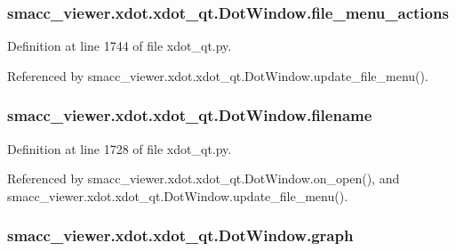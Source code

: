 \subsubsection[{\texorpdfstring{file\+\_\+menu\+\_\+actions}{file_menu_actions}}]{\setlength{\rightskip}{0pt plus 5cm}smacc\+\_\+viewer.\+xdot.\+xdot\+\_\+qt.\+Dot\+Window.\+file\+\_\+menu\+\_\+actions}\hypertarget{classsmacc__viewer_1_1xdot_1_1xdot__qt_1_1DotWindow_a812d913b31f5ef7717e4b0687e8cde4b}{}\label{classsmacc__viewer_1_1xdot_1_1xdot__qt_1_1DotWindow_a812d913b31f5ef7717e4b0687e8cde4b}


Definition at line 1744 of file xdot\+\_\+qt.\+py.



Referenced by smacc\+\_\+viewer.\+xdot.\+xdot\+\_\+qt.\+Dot\+Window.\+update\+\_\+file\+\_\+menu().

\subsubsection[{\texorpdfstring{filename}{filename}}]{\setlength{\rightskip}{0pt plus 5cm}smacc\+\_\+viewer.\+xdot.\+xdot\+\_\+qt.\+Dot\+Window.\+filename}\hypertarget{classsmacc__viewer_1_1xdot_1_1xdot__qt_1_1DotWindow_a8be84c72284dbb6ae2d6e65a03617b23}{}\label{classsmacc__viewer_1_1xdot_1_1xdot__qt_1_1DotWindow_a8be84c72284dbb6ae2d6e65a03617b23}


Definition at line 1728 of file xdot\+\_\+qt.\+py.



Referenced by smacc\+\_\+viewer.\+xdot.\+xdot\+\_\+qt.\+Dot\+Window.\+on\+\_\+open(), and smacc\+\_\+viewer.\+xdot.\+xdot\+\_\+qt.\+Dot\+Window.\+update\+\_\+file\+\_\+menu().

\subsubsection[{\texorpdfstring{graph}{graph}}]{\setlength{\rightskip}{0pt plus 5cm}smacc\+\_\+viewer.\+xdot.\+xdot\+\_\+qt.\+Dot\+Window.\+graph}\hypertarget{classsmacc__viewer_1_1xdot_1_1xdot__qt_1_1DotWindow_adbc10dcc7b25ae1558c43b84308181bd}{}\label{classsmacc__viewer_1_1xdot_1_1xdot__qt_1_1DotWindow_adbc10dcc7b25ae1558c43b84308181bd}


